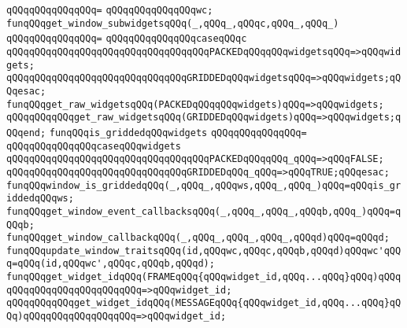 \verb|qQQqqQQqqQQqqQQq=|\newline
\verb|qQQqqQQqqQQqqQQqwc;|\newline
\newline
\verb|funqQQqget_window_subwidgetsqQQq(_,qQQq_,qQQqc,qQQq_,qQQq_)|\newline
\verb|qQQqqQQqqQQqqQQq=|\newline
\verb|qQQqqQQqqQQqqQQqcaseqQQqc|\newline
\verb|qQQqqQQqqQQqqQQqqQQqqQQqqQQqqQQqqQQqPACKEDqQQqqQQqwidgetsqQQq=>qQQqwidgets;|\newline
\verb|qQQqqQQqqQQqqQQqqQQqqQQqqQQqqQQqGRIDDEDqQQqwidgetsqQQq=>qQQqwidgets;qQQqesac;|\newline
\newline
\verb|funqQQqget_raw_widgetsqQQq(PACKEDqQQqqQQqwidgets)qQQq=>qQQqwidgets;|\newline
\verb|qQQqqQQqqQQqget_raw_widgetsqQQq(GRIDDEDqQQqwidgets)qQQq=>qQQqwidgets;qQQqend;|\newline
\newline
\verb|funqQQqis_griddedqQQqwidgets|\newline
\verb|qQQqqQQqqQQqqQQq=|\newline
\verb|qQQqqQQqqQQqqQQqcaseqQQqwidgets|\newline
\verb|qQQqqQQqqQQqqQQqqQQqqQQqqQQqqQQqqQQqPACKEDqQQqqQQq_qQQq=>qQQqFALSE;|\newline
\verb|qQQqqQQqqQQqqQQqqQQqqQQqqQQqqQQqGRIDDEDqQQq_qQQq=>qQQqTRUE;qQQqesac;|\newline
\newline
\verb|funqQQqwindow_is_griddedqQQq(_,qQQq_,qQQqws,qQQq_,qQQq_)qQQq=qQQqis_griddedqQQqws;|\newline
\newline
\verb|funqQQqget_window_event_callbacksqQQq(_,qQQq_,qQQq_,qQQqb,qQQq_)qQQq=qQQqb;|\newline
\newline
\verb|funqQQqget_window_callbackqQQq(_,qQQq_,qQQq_,qQQq_,qQQqd)qQQq=qQQqd;|\newline
\newline
\verb|funqQQqupdate_window_traitsqQQq(id,qQQqwc,qQQqc,qQQqb,qQQqd)qQQqwc'qQQq=qQQq(id,qQQqwc',qQQqc,qQQqb,qQQqd);|\newline
\newline
\verb|funqQQqget_widget_idqQQq(FRAMEqQQq{qQQqwidget_id,qQQq...qQQq}qQQq)qQQqqQQqqQQqqQQqqQQqqQQqqQQq=>qQQqwidget_id;|\newline
\verb|qQQqqQQqqQQqget_widget_idqQQq(MESSAGEqQQq{qQQqwidget_id,qQQq...qQQq}qQQq)qQQqqQQqqQQqqQQqqQQq=>qQQqwidget_id;|\newline
